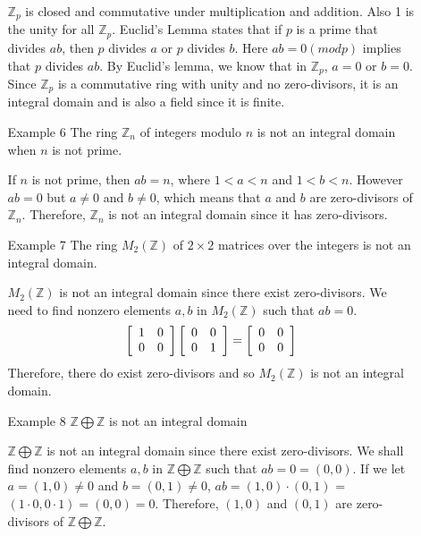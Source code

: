 \documentclass{article}
\newcommand{\Z}{\mathbb Z}
\begin{document}
\begin{enumerate}
\begin{enumerate}
        \begin{flushleft}
        $\Z_p$ is closed and commutative under multiplication and addition. Also 1 is the unity for all $\Z_p$. Euclid's Lemma states that if $p$ is a prime that divides $ab$, then $p$ divides $a$ or $p$ divides $b$. Here $ab = 0 (mod p)$ implies that $p$ divides $ab$. By Euclid's lemma, we know that in $\Z_p$, $a = 0$ or $b = 0$. Since $\Z_p$ is a commutative ring with unity and no zero-divisors, it is an integral domain and is also a field since it is finite.
        \end{flushleft}
        \newpage
        \item[Example 6] The ring $\Z_n$ of integers modulo $n$ is not an integral domain when $n$ is not prime.
        \begin{flushleft}
        If $n$ is not prime, then $ab = n$, where $1 < a < n$ and $1 < b < n$. However $ab = 0$ but $a \not= 0$ and $b \not= 0$, which means that $a$ and $b$ are zero-divisors of $\Z_n$. Therefore, $\Z_n$ is not an integral domain since it has zero-divisors.
        \end{flushleft}
        \item[Example 7] The ring $M_2(\Z)$ of $2 \times 2$ matrices over the integers is not an integral domain.
        \begin{flushleft}
        $M_2(\Z)$ is not an integral domain since there exist zero-divisors. We need to find nonzero elements $a,b$ in $M_2(\Z)$ such that $ab = 0$.
        $$\left[ \begin{array} { l l } { 1 } & { 0 } \\ { 0 } & { 0 } \end{array} \right] \left[ \begin{array} { l l } { 0 } & { 0 } \\ { 0 } & { 1 } \end{array} \right] = \left[ \begin{array} { l l } { 0 } & { 0 } \\ { 0 } & { 0 } \end{array} \right]$$
        Therefore, there do exist zero-divisors and so $M_2(\Z)$ is not an integral domain.
        \end{flushleft}
        \item[Example 8] $\Z \bigoplus \Z$ is not an integral domain
        \begin{flushleft}
        $\Z \bigoplus \Z$ is not an integral domain since there exist zero-divisors. We shall find nonzero elements $a, b $ in $ \Z \bigoplus \Z$ such that $ab = 0 = (0,0)$. If we let $a = (1,0) \not= 0$ and $b = (0, 1) \not= 0$, $ab = (1,0)\cdot (0,1) $ = $ (1\cdot0, 0\cdot1) = (0,0) = 0$. Therefore, $(1,0)$ and $(0,1)$ are zero-divisors of $\Z \bigoplus \Z$.
        \end{flushleft}
    \end{enumerate}
    

\end{enumerate}
\end{document}
